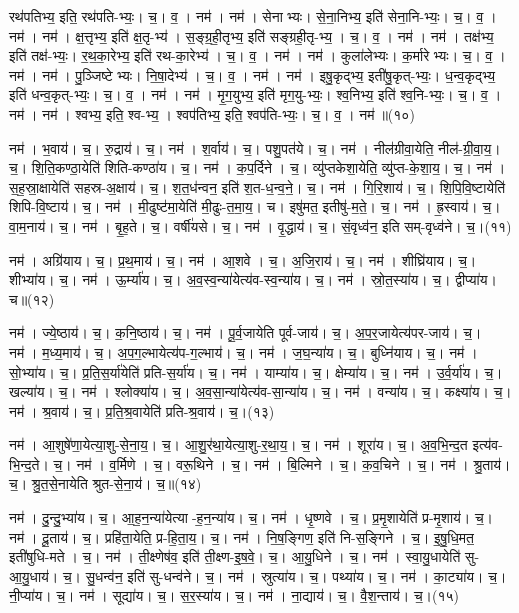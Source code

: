 रथ॑पतिभ्य॒ इति॒ रथ॑पति-भ्यः॒। च॒। व॒। नम॑।
नम॑। सेनाभ्यः। से॒ना॒निभ्य॒ इति॑ सेना॒नि-भ्यः॒। च॒। व॒। नम॑।
नम॑। क्ष॒त्तृभ्य॒ इति॑ क्ष॒तृ-भ्य॑। स॒ङ्ग्र॒ही॒तृभ्य॒ इति॑ सङ्ग्रही॒तृ-भ्य॒। च॒। व॒। नम॑।
नम॑। तक्ष॑भ्य॒ इति॑ तक्ष॑-भ्यः॒। र॒थ॒का॒रेभ्य॒ इति॑ रथ-का॒रेभ्य॑। च॒। व॒। नम॑।
नम॑। कुला॑लेभ्यः। क॒र्मारेभ्यः। च॒। व॒। नम॑।
नम॑। पु॒ञ्जिष्टेभ्यः। नि॒षा॒देभ्य॑। च॒। व॒। नम॑।
नम॑। इषु॒कृद्भ्य॒ इती॑षु॒कृत्-भ्यः॒। ध॒न्व॒कृद्भ्य॒ इति॑ धन्व॒कृत्-भ्यः॒। च॒। व॒। नम॑।
नम॑। मृ॒ग॒युभ्य॒ इति॑ मृग॒यु-भ्यः॒। श्व॒निभ्य॒ इति॑ श्व॒नि-भ्यः॒। च॒। व॒। नम॑।
नम॑। श्वभ्य॒ इति॒ श्व-भ्य॒। श्वप॑तिभ्य॒ इति॒ श्वप॑ति-भ्यः॒। च॒। व॒। नम॑॥(१०)


नम॑। भ॒वाय॑। च॒। रु॒द्राय॑। च॒।
नम॑। श॒र्वाय॑। च॒। पशु॒पत॑ये। च॒।
नम॑। नील॑ग्रीवा॒येति॒ नील॑-ग्री॒वा॒य॒। च॒। शि॒ति॒कण्ठा॒येति॑ शिति-कण्ठा॑य। च॒।
नम॑। क॒प॒र्दिने। च॒। व्यु॑प्तकेशा॒येति॒ व्यु॑प्त-के॒शा॒य॒। च॒।
नम॑। स॒ह॒स्रा॒क्षायेति॑ सहस्र-अ॒क्षाय॑। च॒। श॒त॒ध॑न्वन॒ इति॑ श॒त-ध॒न्व॒ने॒। च॒।
नम॑। गि॒रि॒शाय॑। च॒। शि॒पि॒वि॒ष्टायेति॑ शिपि-वि॒ष्टाय॑। च॒।
नम॑। मी॒ढुष्ट॑मा॒येति॑ मी॒ढुः-त॒मा॒य॒। च। इषु॑मत॒ इतीषु॑-म॒ते॒। च॒।
नम॑। ह्र॒स्वाय॑। च॒। वा॒म॒नाय॑। च॒।
नम॑। बृ॒ह॒ते। च॒। वर्षी॑यसे। च॒।
नम॑। वृ॒द्धाय॑। च॒। सं॒वृध्व॑न॒ इति  सम्-वृध्व॑ने। च॒।(११)


नम॑। अग्रि॑याय। च॒। प्र॒थ॒माय॑। च॒।
नम॑। आ॒शवे। च॒। अ॒जि॒राय॑। च॒।
नम॑। शीघ्रि॑याय। च॒। शीभ्या॑य। च॒।
नम॑। ऊ॒र्म्या॑य। च॒। अ॒व॒स्व॒न्या॑येत्य॑व-स्व॒न्या॑य। च॒।
नम॑। स्रो॒त॒स्या॑य। च॒। द्वीप्या॑य। च॥(१२)


नम॑। ज्ये॒ष्ठाय॑। च॒। क॒नि॒ष्ठाय॑। च॒।
नम॑। पू॒र्व॒जायेति पूर्व-जाय॑। च॒। अ॒प॒र॒जायेत्य॑पर-जाय॑। च॒।
नम॑। म॒ध्य॒माय॑। च॒। अ॒प॒ग॒ल्भायेत्य॑प-ग॒ल्भाय॑। च॒।
नम॑। ज॒घ॒न्या॑य। च॒। बुध्नि॑याय। च॒।
नम॑। सो॒भ्या॑य। च॒। प्र॒ति॒स॒र्या॑येति॑ प्रति-स॒र्या॑य। च॒।
नम॑। याम्या॑य। च॒। क्षेम्या॑य। च॒।
नम॑। उ॒र्व॒र्या॑य। च॒। खल्या॑य। च॒।
नम॑। श्लोक्या॑य। च॒। अ॒व॒सा॒न्या॑येत्य॑व-सा॒न्या॑य। च॒।
नम॑। वन्या॑य। च॒। कक्ष्या॑य। च॒।
नम॑। श्र॒वाय॑। च॒। प्र॒ति॒श्र॒वायेति॑ प्रति-श्र॒वाय॑। च॒।(१३)


नम॑। आ॒शुषे॑णा॒येत्या॒शु-से॒ना॒य॒। च॒। आ॒शु॒र॑था॒येत्या॒शु-र॒था॒य॒। च॒।
नम॑। शूरा॑य। च॒। अ॒व॒भि॒न्द॒त इत्य॑व-भि॒न्द॒ते। च॒।
नम॑। व॒र्मिणे। च॒। वरू॒थिने। च॒।
नम॑। बि॒ल्मिने। च॒। क॒व॒चिने। च॒।
नम॑। श्रु॒ताय॑। च॒। श्रु॒त॒से॒नायेति श्रुत-से॒ना॒य॑। च॒॥(१४)


नम॑। दु॒न्दु॒भ्या॑य। च॒। आ॒ह॒न॒न्या॑येत्या-ह॒न॒न्या॑य। च॒।
नम॑। धृ॒ष्णवे। च॒। प्र॒मृ॒शायेति॑ प्र-मृ॒शाय॑। च॒।
नम॑। दू॒ताय॑। च॒। प्रहि॑ता॒येति॒ प्र-हि॒ता॒य॒। च॒।
नम॑। नि॒ष॒ङ्गिण॒ इति॑ नि-स॒ङ्गिने। च॒। इ॒षु॒धि॒मत॒ इती॑षुधि-मते। च॒। 
नम॑। ती॒क्ष्णेष॑व॒ इति॑ ती॒क्ष्ण-इ॒ष॒वे॒। च॒। आ॒यु॒धिने। च॒।
नम॑। स्वा॒यु॒धायेति॑ सु-आ॒यु॒धाय॑। च॒। सु॒धन्व॑न॒ इति॑ सु-धन्व॑ने। च॒।
नम॑। स्रुत्या॑य। च॒। पथ्या॑य। च॒।
नम॑। का॒ट्या॑य। च॒। नी॒प्या॑य। च॒।
नम॑। सूद्या॑य। च॒। स॒र॒स्या॑य। च॒।
नम॑। ना॒द्याय॑। च॒। वै॒श॒न्ताय॑। च॒।(१५)


